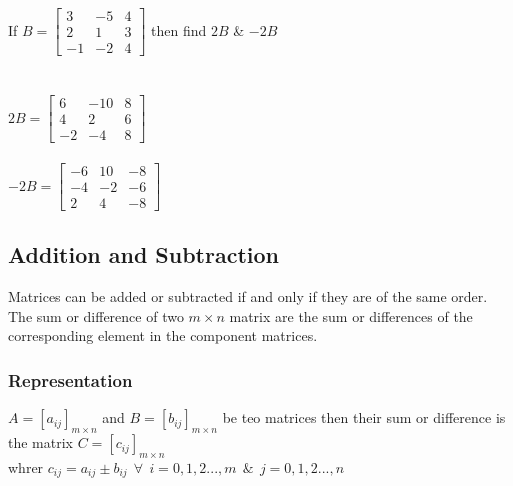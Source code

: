 \documentclass{article}
\begin{document}
	\newpage

	If $ B = \left[ \begin{array}{ccc}
		3  & -5 & 4 \\
		2  & 1  & 3 \\
		-1 & -2 & 4
	\end{array}\right]$
	then find $ 2B $ \& $ -2B $ \\ \\ \\
	$ 2B = \left[ \begin{array}{ccc}
		6 & -10 & 8 \\
		4 & 2 & 6 \\
		-2 & -4 & 8
	\end{array}\right] $ \\ \\ $ -2B = \left[ \begin{array}{ccc}
		-6 & 10 & -8 \\
		-4 & -2 & -6 \\
		2 & 4 & -8
	\end{array}\right] $

	\subsection{Addition and Subtraction}
	Matrices can be added or subtracted if and only if they are of the same order. \\
	The sum or difference of two $ m \times n $ matrix are the sum or differences of the corresponding element in the component matrices.
	
	\subsubsection{Representation}
	$ A = {[a_{ij}]}_{m \times n} $ and $ B = {[b_{ij}]}_{m \times n} $ be teo matrices then their sum or difference is the matrix $ C = {[ c_{ij}]}_{m \times n} $ \\
	whrer $ c_{ij} = a_{ij} \pm b_{ij} ~~\forall ~~ i = 0, 1, 2 ..., m ~~ \& ~~ j = 0, 1, 2 ..., n$
	
\end{document}
